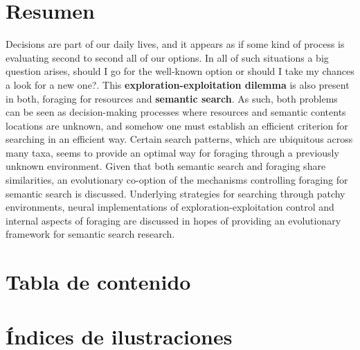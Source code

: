 \documentclass[11pt]{article}
\author{nicoluarte}
\date{\today}
\title{}
\begin{document}
\tableofcontents


\section{Resumen}
\label{sec:orgf08216b}

Decisions are part of our daily lives, and it appears as if some kind of process
is evaluating second to second all of our options. In all of such situations a
big question arises, should I go for the well-known option or should I take my
chances a look for a new one?. This \textbf{exploration-exploitation dilemma} is also
present in both, foraging for resources and \textbf{semantic search}. As such, both
problems can be seen as decision-making processes where resources and semantic
contents locations are unknown, and somehow one must establish an efficient criterion
for searching in an efficient way. Certain search patterns, which are
ubiquitous across many taxa, seems to provide an optimal way for foraging
through a previously unknown environment. Given that both semantic search and
foraging share similarities, an evolutionary co-option of the mechanisms
controlling foraging for semantic search is discussed. Underlying strategies for
searching through patchy environments, neural implementations of
exploration-exploitation control and internal aspects of foraging are discussed
in hopes of providing an evolutionary framework for semantic search research.

\section{Tabla de contenido}
\label{sec:org9a1d744}

\section{Índices de ilustraciones}
\label{sec:org0b24782}
\end{document}
